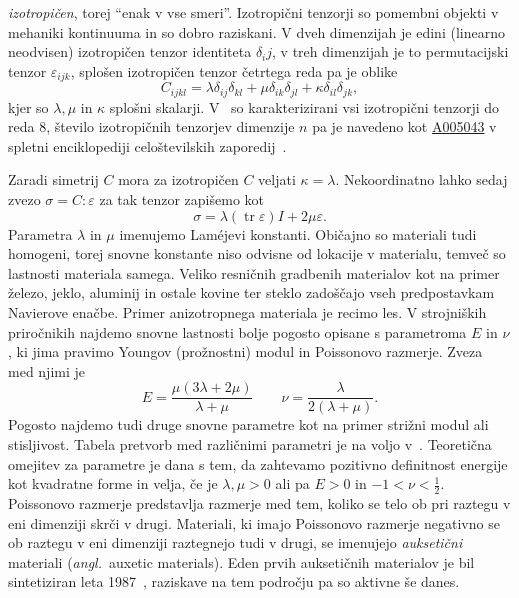 \documentclass[12pt,a4paper,twoside]{article}
\theoremstyle{definition} %
\theoremstyle{plain} %
\numberwithin{equation}{section}
\newcommand{\eps}{\varepsilon}
\newcommand{\ts}{\sigma}
\DeclareMathOperator{\tr}{tr}
\newcommand{\ang}[1]{(\textit{angl.}\ #1)}
\begin{document}
\emph{izotropičen}, torej ``enak v vse smeri''.
Izotropični tenzorji so pomembni objekti v mehaniki kontinuuma in
so dobro raziskani. V dveh dimenzijah je edini (linearno neodvisen)
izotropičen tenzor identiteta $\delta_ij$, v treh dimenzijah je to permutacijski tenzor
$\eps_{ijk}$, splošen izotropičen tenzor četrtega reda pa je oblike
\[
  C_{ijkl} = \lambda \delta_{ij}\delta_{kl} + \mu \delta_{ik}\delta_{jl} +
  \kappa \delta_{il}\delta_{jk},
\]
kjer so $\lambda, \mu$ in $\kappa$ splošni skalarji. V~\cite{kearsley1975linearly} so
karakterizirani vsi izotropični tenzorji do reda 8, število izotropičnih tenzorjev
dimenzije $n$ pa je navedeno kot \href{http://oeis.org/A005043}{A005043} v spletni enciklopediji
celoštevilskih zaporedij~\cite{oeis}.

Zaradi simetrij $C$ mora za izotropičen $C$ veljati $\kappa = \lambda$.
Nekoordinatno lahko sedaj zvezo $\ts = C:\eps$ za tak tenzor zapišemo kot
\begin{equation}
  \ts = \lambda (\tr\eps)I + 2\mu \eps.
  \label{eq:hooke-isotropic}
\end{equation}
Parametra $\lambda$ in $\mu$ imenujemo Lam\'{e}jevi konstanti.
Običajno so materiali tudi homogeni, torej snovne konstante niso odvisne od
lokacije v materialu, temveč so lastnosti materiala samega.
Veliko resničnih gradbenih materialov kot na primer železo, jeklo, aluminij in
ostale kovine ter steklo zadoščajo vseh predpostavkam Navierove enačbe. Primer
anizotropnega materiala je recimo les.  V strojniških priročnikih najdemo snovne
lastnosti bolje pogosto opisane s parametroma $E$ in $\nu$, ki jima pravimo
Youngov (prožnostni) modul in Poissonovo razmerje. Zveza med njimi je
\[
  E = \frac{\mu(3\lambda+2\mu)}{\lambda+\mu} \qquad \nu =
  \frac{\lambda}{2(\lambda+\mu)}.
\]
Pogosto najdemo tudi druge snovne parametre kot na primer strižni modul ali
stisljivost. Tabela pretvorb med različnimi parametri je na voljo v~\cite[tabela
5.1, str.\ 215]{slaughter2012linearized}. Teoretična omejitev za parametre je
dana s tem, da zahtevamo pozitivno definitnost energije kot kvadratne forme in
velja, če je $\lambda, \mu > 0$ ali pa $E > 0$ in $-1 < \nu < \frac12$.
Poissonovo razmerje predstavlja razmerje med tem, koliko se telo ob pri raztegu v eni dimenziji
skrči v drugi. Materiali, ki imajo Poissonovo razmerje negativno se ob raztegu v eni dimenziji
raztegnejo tudi v drugi, se imenujejo \emph{auksetični} materiali \ang{auxetic materials}.
Eden prvih auksetičnih materialov je bil sintetiziran leta 1987~\cite{lakes1987foam}, raziskave na
tem področju pa so aktivne še danes.
\end{document}

